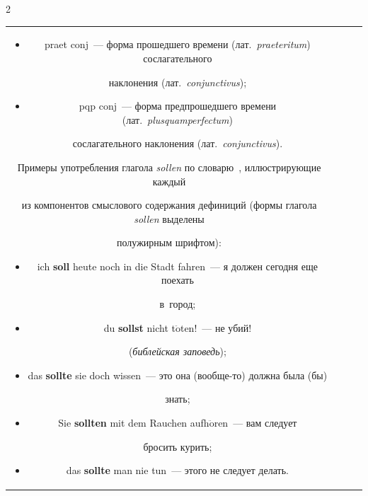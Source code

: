 \begin{multicols}{2}
\begin{table}
\begin{center}
\begin{tabular}{|c|c|c|p{120mm}|}
{\begin{itemize}
\addtolength{\itemsep}{-4pt}


\item praet conj~--- форма прошедшего времени (лат.\ \textit{praeteritum}) сослагательного 


наклонения (лат.\ \textit{conjunctivus});


\item pqp conj~--- форма предпрошедшего времени (лат.\ \textit{plusquamperfectum}) 


сослагательного наклонения (лат.\ \textit{conjunctivus}).


\end{itemize}


Примеры употребления глагола \textit{sollen} по словарю~\cite{17-gon}, иллюстрирующие каждый 


из компонентов смыслового содержания дефиниций (формы глагола \textit{sollen} выделены 


полужирным шрифтом):


\begin{itemize}


\addtolength{\itemsep}{-4pt}


\item[$a$.] ich \textbf{soll} heute noch in die Stadt fahren~--- я должен сегодня еще поехать 


в~город;


\item[$b$.] du \textbf{sollst} nicht t$\ddot{\mbox{o}}$ten!~--- не убий! 


(\textit{библейская заповедь});


\item[$m$.] das \textbf{sollte} sie doch wissen~--- это она (вообще-то) должна была (бы) 


знать;


\item[$n$.] Sie \textbf{sollten} mit dem Rauchen aufh$\ddot{\mbox{o}}$ren~--- вам следует 


бросить курить;


\item[$o$.] das \textbf{sollte} man nie tun~--- этого не следует делать.


\end{itemize}


}


\end{tabular}


\end{center}


\vspace*{-23pt}



\end{table}
\end{multicols}
